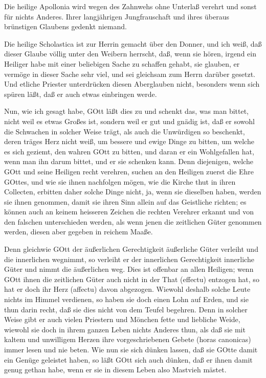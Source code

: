 Die heilige Apollonia wird wegen des Zahnwehs ohne Unterlaß verehrt und sonst für nichts Anderes. Ihrer langjährigen Jungfrauschaft und ihres überaus brünstigen Glaubens gedenkt niemand.

Die heilige Scholastica ist zur Herrin gemacht über den Donner, und ich weiß, daß dieser Glaube völlig unter den Weibern herrscht, daß, wenn sie hören, irgend ein Heiliger habe mit einer beliebigen Sache zu schaffen gehabt, sie glauben, er vermöge in dieser Sache sehr viel, und sei gleichsam zum Herrn darüber gesetzt. Und etliche Priester unterdrücken diesen Aberglauben nicht, besonders wenn sich spüren läßt, daß er auch etwas einbringen werde.

Nun, wie ich gesagt habe, GOtt läßt dies zu und schenkt das, was man bittet, nicht weil es etwas Großes ist, sondern weil er gut und gnädig ist, daß er sowohl die Schwachen in solcher Weise trägt, als auch die Unwürdigen so beschenkt, deren träges Herz nicht weiß, um bessere und ewige Dinge zu bitten, um welche es sich geziemt, den wahren GOtt zu bitten, und daran er ein Wohlgefallen hat, wenn man ihn darum bittet, und er sie schenken kann. Denn diejenigen, welche GOtt und seine Heiligen recht verehren, suchen an den Heiligen zuerst die Ehre GOttes, und wie sie ihnen nachfolgen mögen, wie die Kirche thut in ihren Collecten, erbitten daher solche Dinge nicht, ja, wenn sie dieselben haben, werden sie ihnen genommen, damit sie ihren Sinn allein auf das Geistliche richten; es können auch an keinem heisseren Zeichen die rechten Verehrer erkannt und von den falschen unterschieden werden, als wenn jenen die zeitlichen Güter genommen werden, diesen aber gegeben in reichem Maaße.

Denn gleichwie GOtt der äußerlichen Gerechtigkeit äußerliche Güter verleiht und die innerlichen
wegnimmt, so verleiht er der innerlichen Gerechtigkeit innerliche Güter und nimmt die äußerlichen weg. Dies ist offenbar an allen Heiligen; wenn GOtt ihnen die zeitlichen Güter auch nicht in der That (effectu) entzogen hat, so hat er doch ihr Herz (affectu) davon abgezogen. Wiewohl deshalb solche Leute nichts im Himmel verdienen, so haben sie doch einen Lohn auf Erden, und sie thun darin recht, daß sie dies nicht von dem Teufel begehren. Denn in solcher Weise gibt er auch vielen Priestern und Mönchen fette und liebliche Weide, wiewohl sie doch in ihrem ganzen Leben nichts Anderes thun, als daß sie mit kaltem und unwilligem Herzen ihre vorgeschriebenen Gebete (horas canonicas) immer lesen und nie beten. Wie nun sie sich dünken lassen, daß sie GOtte damit ein Genüge geleistet haben, so läßt GOtt sich auch dünken, daß er ihnen damit genug gethan habe, wenn er sie in diesem Leben also Mastvieh mästet.

